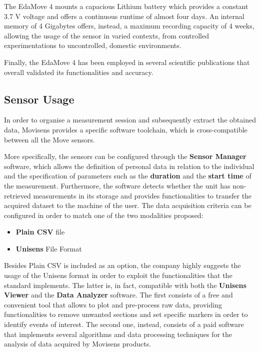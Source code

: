 The EdaMove 4 mounts a capacious Lithium battery which provides a constant 3.7 V voltage and offers a continuous runtime of almost four days. An internal memory of 4 Gigabytes offers, instead, a maximum recording capacity of 4 weeks, allowing the usage of the sensor in varied contexts, from controlled experimentations to uncontrolled, domestic environments. 

Finally, the EdaMove 4 has been employed in several scientific publications that overall validated its functionalities and accuracy.

\subsection{Sensor Usage}\label{subsec:edamove4-usage}

In order to organise a measurement session and subsequently extract the obtained data, Movisens provides a specific software toolchain, which is cross-compatible between all the Move sensors. 

More specifically, the sensors can be configured through the \textbf{Sensor Manager} software, which allows the definition of personal data in relation to the individual and the specification of parameters such as the \textbf{duration} and the \textbf{start time} of the measurement. Furthermore, the software detects whether the unit has non-retrieved measurements in its storage and provides functionalities to transfer the acquired dataset to the machine of the user. The data acquisition criteria can be configured in order to match one of the two modalities proposed:

\begin{itemize}
    \item \textbf{Plain CSV} file
    \item \textbf{Unisens} File Format 
\end{itemize}

Besides Plain CSV is included as an option, the company highly suggests the usage of the Unisens format in order to exploit the functionalities that the standard implements. The latter is, in fact, compatible with both the \textbf{Unisens Viewer} and the \textbf{Data Analyzer} software. The first consists of a free and convenient tool that allows to plot and pre-process raw data, providing functionalities to remove unwanted sections and set specific markers in order to identify events of interest. The second one, instead, consists of a paid software that implements several algorithms and data processing techniques for the analysis of data acquired by Movisens products.

